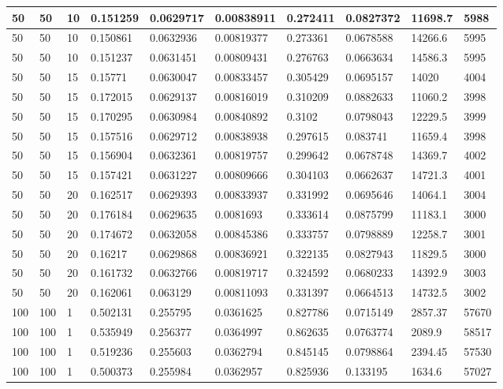 \begin{landscape}
\begin{longtable}{ | l | l | l | l | l | l | l | l | l | l | }
50 & 50 & 10 & 0.151259 & 0.0629717 & 0.00838911 & 0.272411 & 0.0827372 & 11698.7 & 5988\\ \hline
50 & 50 & 10 & 0.150861 & 0.0632936 & 0.00819377 & 0.273361 & 0.0678588 & 14266.6 & 5995\\ \hline
50 & 50 & 10 & 0.151237 & 0.0631451 & 0.00809431 & 0.276763 & 0.0663634 & 14586.3 & 5995\\ \hline
50 & 50 & 15 & 0.15771 & 0.0630047 & 0.00833457 & 0.305429 & 0.0695157 & 14020 & 4004\\ \hline
50 & 50 & 15 & 0.172015 & 0.0629137 & 0.00816019 & 0.310209 & 0.0882633 & 11060.2 & 3998\\ \hline
50 & 50 & 15 & 0.170295 & 0.0630984 & 0.00840892 & 0.3102 & 0.0798043 & 12229.5 & 3999\\ \hline
50 & 50 & 15 & 0.157516 & 0.0629712 & 0.00838938 & 0.297615 & 0.083741 & 11659.4 & 3998\\ \hline
50 & 50 & 15 & 0.156904 & 0.0632361 & 0.00819757 & 0.299642 & 0.0678748 & 14369.7 & 4002\\ \hline
50 & 50 & 15 & 0.157421 & 0.0631227 & 0.00809666 & 0.304103 & 0.0662637 & 14721.3 & 4001\\ \hline
50 & 50 & 20 & 0.162517 & 0.0629393 & 0.00833937 & 0.331992 & 0.0695646 & 14064.1 & 3004\\ \hline
50 & 50 & 20 & 0.176184 & 0.0629635 & 0.0081693 & 0.333614 & 0.0875799 & 11183.1 & 3000\\ \hline
50 & 50 & 20 & 0.174672 & 0.0632058 & 0.00845386 & 0.333757 & 0.0798889 & 12258.7 & 3001\\ \hline
50 & 50 & 20 & 0.16217 & 0.0629868 & 0.00836921 & 0.322135 & 0.0827943 & 11829.5 & 3000\\ \hline
50 & 50 & 20 & 0.161732 & 0.0632766 & 0.00819717 & 0.324592 & 0.0680233 & 14392.9 & 3003\\ \hline
50 & 50 & 20 & 0.162061 & 0.063129 & 0.00811093 & 0.331397 & 0.0664513 & 14732.5 & 3002\\ \hline
100 & 100 & 1 & 0.502131 & 0.255795 & 0.0361625 & 0.827786 & 0.0715149 & 2857.37 & 57670\\ \hline
100 & 100 & 1 & 0.535949 & 0.256377 & 0.0364997 & 0.862635 & 0.0763774 & 2089.9 & 58517\\ \hline
100 & 100 & 1 & 0.519236 & 0.255603 & 0.0362794 & 0.845145 & 0.0798864 & 2394.45 & 57530\\ \hline
100 & 100 & 1 & 0.500373 & 0.255984 & 0.0362957 & 0.825936 & 0.133195 & 1634.6 & 57027\\ \hline

\end{longtable}
\end{landscape}
